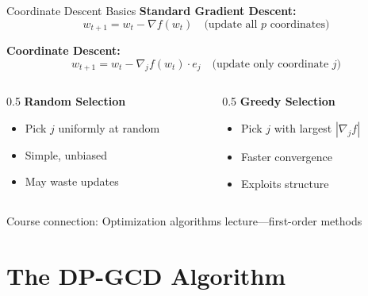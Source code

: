 \documentclass{beamer}
\begin{document}
\begin{frame}{Coordinate Descent Basics}
\textbf{Standard Gradient Descent:}
\[
w_{t+1} = w_t - \nabla f(w_t) \quad \text{(update all $p$ coordinates)}
\]

\vspace{1em}

\textbf{Coordinate Descent:}
\[
w_{t+1} = w_t - \nabla_j f(w_t) \cdot e_j \quad \text{(update only coordinate $j$)}
\]

\vspace{1em}

\begin{columns}[T]
\begin{column}{0.5\textwidth}
\textbf{Random Selection}
\begin{itemize}
\item Pick $j$ uniformly at random
\item Simple, unbiased
\item May waste updates
\end{itemize}
\end{column}

\begin{column}{0.5\textwidth}
\textbf{Greedy Selection}
\begin{itemize}
\item Pick $j$ with largest $|\nabla_j f|$
\item Faster convergence
\item Exploits structure
\end{itemize}
\end{column}
\end{columns}

\vspace{0.5em}

\alert{Course connection:} Optimization algorithms lecture—first-order methods
\end{frame}

\section{The DP-GCD Algorithm}
\end{document}
